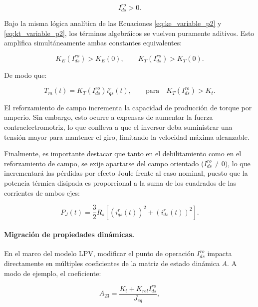 \documentclass[10pt,a4paper]{article}
\begin{document}
\begin{equation*}
    I_{ds}^{ro}>0.
\end{equation*}

Bajo la misma lógica analítica de las Ecuaciones \eqref{eq:ke_variable_p2} y \eqref{eq:kt_variable_p2}, 
los términos algebráicos se vuelven puramente aditivos. Esto amplifica simultáneamente ambas constantes equivalentes:

\begin{equation*}
    K_E(I_{ds}^{ro})>K_E(0),
    \qquad
    K_T(I_{ds}^{ro})>K_T(0).
\end{equation*}

De modo que:

\begin{equation*}
    T_m(t)=K_T(I_{ds}^{ro})i_{qs}^{r}(t),
    \qquad \text{para} \quad
    K_T(I_{ds}^{ro})>K_t.
\end{equation*}

El reforzamiento de campo incrementa la capacidad de producción de torque por amperio.
Sin embargo, esto ocurre a expensas de aumentar la fuerza contraelectromotriz, 
lo que conlleva a que el inversor deba suministrar una tensión mayor para mantener el giro,
limitando la velocidad máxima alcanzable.

Finalmente, es importante destacar que tanto en el debilitamiento como en el reforzamiento de campo, 
se exije apartarse del campo orientado ($I_{ds}^{ro} \neq 0$), lo que incrementará las pérdidas por efecto Joule frente al caso nominal,
puesto que la potencia térmica disipada es proporcional a la suma de los cuadrados de las corrientes de ambos ejes:

\begin{equation}
	P_J(t)=
	\frac{3}{2}R_s
	\left[
	\left(i_{qs}^{r}(t)\right)^2+
	\left(i_{ds}^{r}(t)\right)^2
	\right].
\end{equation}

\paragraph{Migración de propiedades dinámicas.}
En el marco del modelo LPV, modificar el punto de operación $I_{ds}^{ro}$ impacta directamente en múltiples coeficientes de la matriz de estado dinámica $A$.
A modo de ejemplo, el coeficiente:

\begin{equation}
    A_{23}=\frac{K_t+K_{rel}I_{ds}^{ro}}{J_{eq}},
    \label{eq:A23_lpv}
\end{equation}
\end{document}
